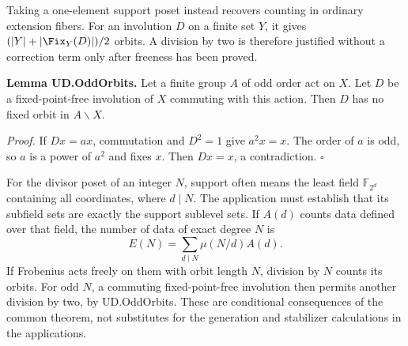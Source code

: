Taking a one-element support poset instead recovers counting in ordinary
extension fibers. For an involution $D$ on a finite set $Y$, it gives
$(|Y|+|\Fix_Y(D)|)/2$ orbits. A division by two is therefore justified
without a correction term only after freeness has been proved.

\textbf{Lemma UD.OddOrbits.}
Let a finite group $A$ of odd order act on $X$. Let $D$ be a fixed-point-free
involution of $X$ commuting with this action. Then $D$ has no fixed orbit
in $A\backslash X$.

\emph{Proof.} If $Dx=ax$, commutation and $D^2=1$ give $a^2x=x$.
The order of $a$ is odd, so $a$ is a power of $a^2$ and fixes $x$.
Then $Dx=x$, a contradiction. \(\square\)

For the divisor poset of an integer $N$, support often means the least
field $\mathbb F_{2^d}$ containing all coordinates, where $d\mid N$.
The application must establish that its subfield sets are exactly the
support sublevel sets. If $A(d)$ counts data defined over that field,
the number of data of exact degree $N$ is
\[
 E(N)=\sum_{d\mid N}\mu(N/d)A(d).
\]
If Frobenius acts freely on them with orbit length $N$, division by $N$
counts its orbits. For odd $N$, a commuting fixed-point-free involution
then permits another division by two, by UD.OddOrbits. These are conditional
consequences of the common theorem, not substitutes for the generation and
stabilizer calculations in the applications.
